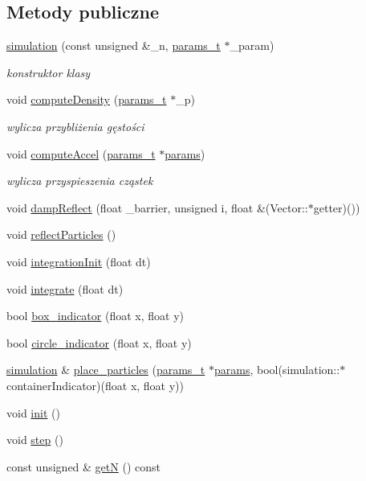 \subsection*{Metody publiczne}
\begin{DoxyCompactItemize}
\item 
\hyperlink{classsimulation_a30fdcc611ae9a656a3aebb8445e4607d}{simulation} (const unsigned \&\-\_\-n, \hyperlink{structparams__t}{params\-\_\-t} $\ast$\-\_\-param)
\begin{DoxyCompactList}\small\item\em konstruktor klasy \end{DoxyCompactList}\item 
void \hyperlink{classsimulation_a7679fcd9a25d6cb5597338d054a30684}{compute\-Density} (\hyperlink{structparams__t}{params\-\_\-t} $\ast$\-\_\-p)
\begin{DoxyCompactList}\small\item\em wylicza przybliżenia gęstości \end{DoxyCompactList}\item 
void \hyperlink{classsimulation_a16b945b81e27680a709fffd8663bf856}{compute\-Accel} (\hyperlink{structparams__t}{params\-\_\-t} $\ast$\hyperlink{classsimulation_a861b82cc3c0e7e58abfba464a133dae3}{params})
\begin{DoxyCompactList}\small\item\em wylicza przyspieszenia cząstek \end{DoxyCompactList}\item 
void \hyperlink{classsimulation_a353d4dd3a66197360e882bc29a6fef0b}{damp\-Reflect} (float \-\_\-barrier, unsigned i, float \&(Vector\-::$\ast$getter)())
\item 
void \hyperlink{classsimulation_a9cb3fe3f985ceb039736a666923a20b5}{reflect\-Particles} ()
\item 
void \hyperlink{classsimulation_a300e67649652f2ae9337af3d5244e0f7}{integration\-Init} (float dt)
\item 
void \hyperlink{classsimulation_a2b1ca39aee7b85ac2babecfd2784c459}{integrate} (float dt)
\item 
bool \hyperlink{classsimulation_a98d5516416b67721c545ae7b88d74114}{box\-\_\-indicator} (float x, float y)
\item 
bool \hyperlink{classsimulation_a6b58ab0f0426309e421e4f860225d068}{circle\-\_\-indicator} (float x, float y)
\item 
\hyperlink{classsimulation}{simulation} \& \hyperlink{classsimulation_a64eadae8e6523e419af971fc7c7d8690}{place\-\_\-particles} (\hyperlink{structparams__t}{params\-\_\-t} $\ast$\hyperlink{classsimulation_a861b82cc3c0e7e58abfba464a133dae3}{params}, bool(simulation\-::$\ast$container\-Indicator)(float x, float y))
\item 
void \hyperlink{classsimulation_a2e12616e089dd7f9742c25933bf630ef}{init} ()
\item 
void \hyperlink{classsimulation_a111e26e535d53ced834dbd52948b5d69}{step} ()
\item 
const unsigned \& \hyperlink{classsimulation_abe09252527aa58fbec8144063be3e950}{get\-N} () const 
\end{DoxyCompactItemize}

